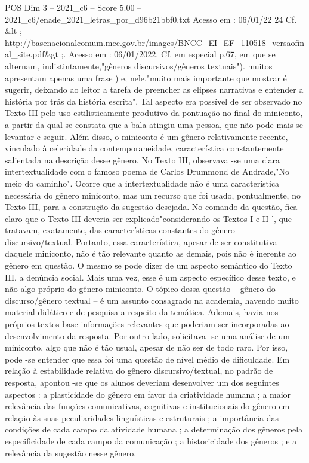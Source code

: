 \begin{textsample}{POS Dim 3 – 2021\_c6 – Score 5.00 – 2021\_c6/enade\_2021\_letras\_por\_d96b21bbf0.txt}
Acesso em : 06/01/22 24 Cf. \&lt ; http://basenacionalcomum.mec.gov.br/images/BNCC\_EI\_EF\_110518\_versaofinal\_site.pdf\&gt ;.
Acesso em : 06/01/2022.
Cf. em especial p.67, em que se alternam, indistintamente,"gêneros discursivos/gêneros textuais"). muitos apresentam apenas uma frase ) e, nele,"muito mais importante que mostrar é sugerir, deixando ao leitor a tarefa de preencher as elipses narrativas e entender a história por trás da história escrita".
Tal aspecto era possível de ser observado no Texto III pelo uso estilisticamente produtivo da pontuação no final do miniconto, a partir da qual se constata que a bala atingiu uma pessoa, que não pode mais se levantar e seguir.
Além disso, o miniconto é um gênero relativamente recente, vinculado à celeridade da contemporaneidade, característica constantemente salientada na descrição desse gênero.
No Texto III, observava -se uma clara intertextualidade com o famoso poema de Carlos Drummond de Andrade,"No meio do caminho".
Ocorre que a intertextualidade não é uma característica necessária do gênero miniconto, mas um recurso que foi usado, pontualmente, no Texto III, para a construção da sugestão desejada.
No comando da questão, fica claro que o Texto III deveria ser explicado"considerando os Textos I e II ', que tratavam, exatamente, das características constantes do gênero discursivo/textual.
Portanto, essa característica, apesar de ser constitutiva daquele miniconto, não é tão relevante quanto as demais, pois não é inerente ao gênero em questão.
O mesmo se pode dizer de um aspecto semântico do Texto III, a denúncia social.
Mais uma vez, esse é um aspecto específico desse texto, e não algo próprio do gênero miniconto.
O tópico dessa questão – gênero do discurso/gênero textual – é um assunto consagrado na academia, havendo muito material didático e de pesquisa a respeito da temática.
Ademais, havia nos próprios textos-base informações relevantes que poderiam ser incorporadas ao desenvolvimento da resposta.
Por outro lado, solicitava -se uma análise de um miniconto, algo que não é tão usual, apesar de não ser de todo raro.
Por isso, pode -se entender que essa foi uma questão de nível médio de dificuldade.
Em relação à estabilidade relativa do gênero discursivo/textual, no padrão de resposta, apontou -se que os alunos deveriam desenvolver um dos seguintes aspectos : a plasticidade do gênero em favor da criatividade humana ; a maior relevância das funções comunicativas, cognitivas e institucionais do gênero em relação às suas peculiaridades linguísticas e estruturais ; a importância das condições de cada campo da atividade humana ; a determinação dos gêneros pela especificidade de cada campo da comunicação ; a historicidade dos gêneros ; e a relevância da sugestão nesse gênero.

\end{textsample}
